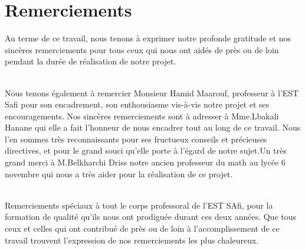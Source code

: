 \documentclass[a4paper]{report}
\begin{document}
\chapter*{Remerciements}
Au terme de ce travail, nous tenons à exprimer notre profonde gratitude et nos sincères remerciements pour tous ceux qui nous ont aidés de près ou de loin pendant la durée de réalisation de notre projet.\\\\
\par Nous tenons également à remercier Monsieur Hamid Maarouf, professeur à l’EST Safi pour son encadrement, son enthousiasme vis-à-vis notre projet et ses encouragements. Nos sincères remerciements sont à adresser à Mme.Lbakali Hanane qui elle a fait l’honneur de nous encadrer tout au long de ce travail. Nous l'en sommes très reconnaissants pour ses fructueux conseils et précieuses directives, et pour le grand souci qu’elle porte à l’égard de notre sujet.Un très grand merci à M.Belkharchi Driss notre ancien professeur du math au lycée 6 novembre qui nous a très aider pour la réalisation de ce projet.\\\\
\par Remerciements spéciaux à tout le corps professoral de l'EST SAfi, pour la formation de qualité qu’ils nous ont prodiguée durant ces deux années. Que tous ceux et celles qui ont contribué de près ou de loin à l’accomplissement de ce travail trouvent l’expression de nos
remerciements les plus chaleureux.
\tableofcontents
\newpage
\listoffigures
\newpage
\listoftables
\end{document}
